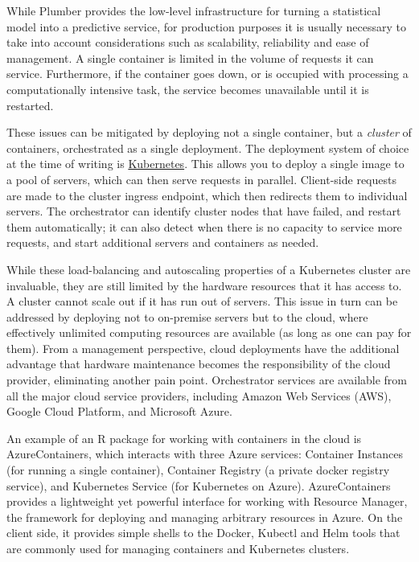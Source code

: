 While Plumber provides the low-level infrastructure for turning a
statistical model into a predictive service, for production purposes it
is usually necessary to take into account considerations such as
scalability, reliability and ease of management. A single container is
limited in the volume of requests it can service. Furthermore, if the
container goes down, or is occupied with processing a computationally
intensive task, the service becomes unavailable until it is restarted.

These issues can be mitigated by deploying not a single container, but a
\emph{cluster} of containers, orchestrated as a single deployment. The
deployment system of choice at the time of writing is
\href{https://kubernetes.io}{Kubernetes}. This allows you to deploy a
single image to a pool of servers, which can then serve requests in
parallel. Client-side requests are made to the cluster ingress endpoint,
which then redirects them to individual servers. The orchestrator can
identify cluster nodes that have failed, and restart them automatically;
it can also detect when there is no capacity to service more requests,
and start additional servers and containers as needed.

While these load-balancing and autoscaling properties of a Kubernetes
cluster are invaluable, they are still limited by the hardware resources
that it has access to. A cluster cannot scale out if it has run out of
servers. This issue in turn can be addressed by deploying not to
on-premise servers but to the cloud, where effectively unlimited
computing resources are available (as long as one can pay for them).
From a management perspective, cloud deployments have the additional
advantage that hardware maintenance becomes the responsibility of the
cloud provider, eliminating another pain point. Orchestrator services
are available from all the major cloud service providers, including
Amazon Web Services (AWS), Google Cloud Platform, and Microsoft Azure.

An example of an R package for working with containers in the cloud is
AzureContainers, which interacts with three Azure services: Container
Instances (for running a single container), Container Registry (a
private docker registry service), and Kubernetes Service (for Kubernetes
on Azure). AzureContainers provides a lightweight yet powerful interface
for working with Resource Manager, the framework for deploying and
managing arbitrary resources in Azure. On the client side, it provides
simple shells to the Docker, Kubectl and Helm tools that are commonly
used for managing containers and Kubernetes clusters.

